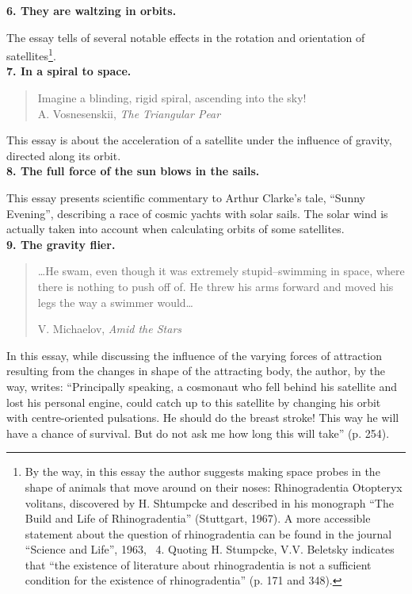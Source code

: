 \documentclass[12pt]{amsart}
\begin{document}
\noindent\textbf{6. They are waltzing in orbits.}

The essay tells of several notable effects in the rotation and orientation of
satellites\footnote{By the way, in this essay the author suggests making space
probes in the shape of animals that move around on their noses: Rhinogradentia
Otopteryx volitans, discovered by H. Shtumpcke and described in his monograph
``The Build and Life of Rhinogradentia'' (Stuttgart, 1967).
A more accessible statement about the question of rhinogradentia can be found in
the journal ``Science and Life'', 1963, \textnumero~4.
Quoting H. Stumpcke, V.V. Beletsky indicates that ``the existence of literature
about rhinogradentia is not a sufficient condition for the existence of
rhinogradentia'' (p. 171 and 348).}.\\

\noindent\textbf{7. In a spiral to space.}

\begin{quote}
Imagine a blinding, rigid spiral, ascending into the sky!\\

A. Vosnesenskii, \textit{The Triangular Pear}
\end{quote}

This essay is about the acceleration of a satellite under the influence of
gravity, directed along its orbit.\\

\noindent\textbf{8. The full force of the sun blows in the sails.}

This essay presents scientific commentary to Arthur Clarke's tale, ``Sunny
Evening'', describing a race of cosmic yachts with solar sails.
The solar wind is actually taken into account when calculating orbits of some
satellites.\\

\noindent\textbf{9. The gravity flier.}

\begin{quote}
\indent\dots He swam, even though it was extremely stupid--swimming in space,
where there is nothing to push off of.
He threw his arms forward and moved his legs the way a swimmer would\dots

V. Michaelov, \textit{Amid the Stars}
\end{quote}

In this essay, while discussing the influence of the varying forces of
attraction resulting from the changes in shape of the attracting body, the
author, by the way, writes: ``Principally speaking, a cosmonaut who fell behind
his satellite and lost his personal engine, could catch up to this satellite by
changing his orbit with centre-oriented pulsations.
He should do the breast stroke!
This way he will have a chance of survival.
But do not ask me how long this will take'' (p. 254).
\end{document}
